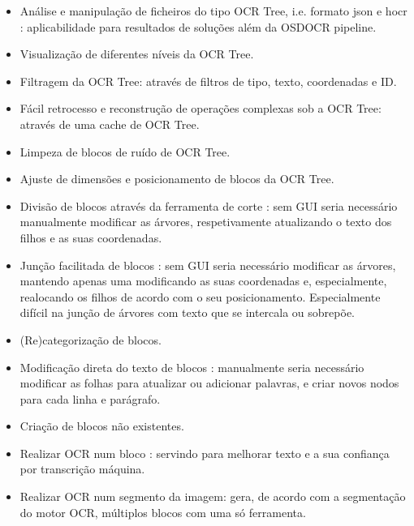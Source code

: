 \begin{itemize}\setlength\itemsep{-0.5em}
	\item Análise e manipulação de ficheiros do tipo OCR Tree, i.e. formato json e hocr : aplicabilidade para resultados de soluções além da OSDOCR pipeline.
	
	\item Visualização de diferentes níveis da OCR Tree.
	
	\item Filtragem da OCR Tree: através de filtros de tipo, texto, coordenadas e ID.
	
	\item Fácil retrocesso e reconstrução de operações complexas sob a OCR Tree: através de uma cache de OCR Tree.
	
	\item Limpeza de blocos de ruído de OCR Tree.
	
	\item Ajuste de dimensões e posicionamento de blocos da OCR Tree.
	
	\item Divisão de blocos através da ferramenta de corte : sem GUI seria necessário manualmente modificar as árvores, respetivamente atualizando o texto dos filhos e as suas coordenadas.
	
	\item Junção facilitada de blocos : sem GUI seria necessário modificar as árvores, mantendo apenas uma modificando as suas coordenadas e, especialmente, realocando os filhos de acordo com o seu posicionamento. Especialmente difícil na junção de árvores com texto que se intercala ou sobrepõe.
	
	\item (Re)categorização de blocos.
	
	\item Modificação direta do texto de blocos : manualmente seria necessário modificar as folhas para atualizar ou adicionar palavras, e criar novos nodos para cada linha e parágrafo.
	
	\item Criação de blocos não existentes.
	
	\item Realizar OCR num bloco : servindo para melhorar texto e a sua confiança por transcrição máquina.
	
	\item Realizar OCR num segmento da imagem: gera, de acordo com a segmentação do motor OCR, múltiplos blocos com uma só ferramenta.
	

\end{itemize}
